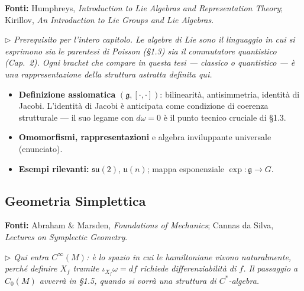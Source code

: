\documentclass[12pt, a4paper]{article}
\newcommand{\fonti}[1]{%
	\begin{fontebox}
		\textcolor{fontecolor}{\footnotesize\textbf{Fonti:} #1}
	\end{fontebox}%
}
\newcommand{\nota}[1]{%
	\par\smallskip
	\noindent\textit{\small $\triangleright$\; #1}
	\par\smallskip
}
\begin{document}
	\fonti{Humphreys, \textit{Introduction to Lie Algebras and Representation Theory};
		Kirillov, \textit{An Introduction to Lie Groups and Lie Algebras}.}
	
	\nota{Prerequisito per l'intero capitolo. Le algebre di Lie sono il linguaggio in cui
		si esprimono sia le parentesi di Poisson (\S1.3) sia il commutatore quantistico
		(Cap.\ 2). Ogni bracket che compare in questa tesi --- classico o quantistico ---
		è una rappresentazione della struttura astratta definita qui.}
	
	\begin{itemize}
		\item \textbf{Definizione assiomatica} $(\mathfrak{g},[\cdot,\cdot])$: bilinearità,
		antisimmetria, identità di Jacobi. L'identità di Jacobi è anticipata come
		condizione di coerenza strutturale --- il suo legame con $d\omega=0$ è il punto
		tecnico cruciale di \S1.3.
		\item \textbf{Omomorfismi, rappresentazioni} e algebra inviluppante universale
		(enunciato).
		\item \textbf{Esempi rilevanti:} $\mathfrak{su}(2)$, $\mathfrak{u}(n)$; mappa
		esponenziale $\exp:\mathfrak{g}\to G$.
	\end{itemize}
	
	\subsection{Geometria Simplettica}
	
	\fonti{Abraham \& Marsden, \textit{Foundations of Mechanics};
		Cannas da Silva, \textit{Lectures on Symplectic Geometry}.}
	
	\nota{Qui entra $C^\infty(M)$: è lo spazio in cui le hamiltoniane vivono naturalmente,
		perché definire $X_f$ tramite $\iota_{X_f}\omega = df$ richiede differenziabilità
		di $f$. Il passaggio a $C_0(M)$ avverrà in \S1.5, quando si vorrà una struttura
		di $C^*$-algebra.}
	
\end{document}
